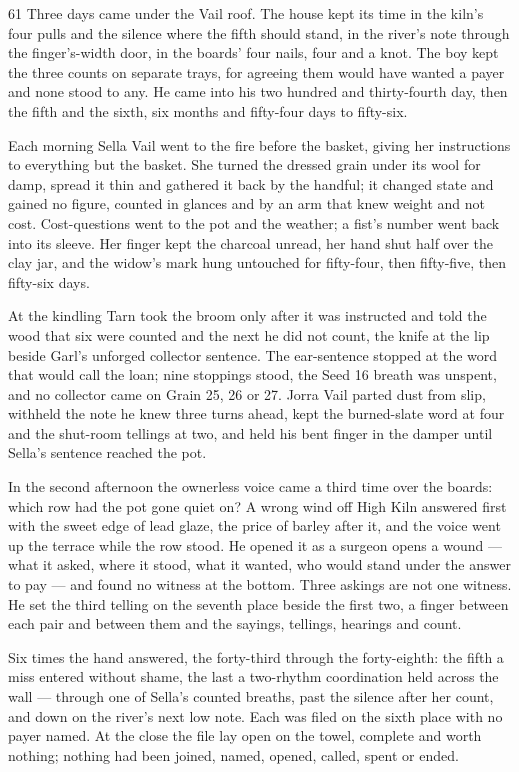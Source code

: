 \begin{CRchronicle}{61}
Three days came under the Vail roof. The house kept its time in the kiln’s four pulls and the silence where the fifth should stand, in the river’s note through the finger’s-width door, in the boards’ four nails, four and a knot. The boy kept the three counts on separate trays, for agreeing them would have wanted a payer and none stood to any. He came into his two hundred and thirty-fourth day, then the fifth and the sixth, six months and fifty-four days to fifty-six.

Each morning Sella Vail went to the fire before the basket, giving her instructions to everything but the basket. She turned the dressed grain under its wool for damp, spread it thin and gathered it back by the handful; it changed state and gained no figure, counted in glances and by an arm that knew weight and not cost. Cost-questions went to the pot and the weather; a fist’s number went back into its sleeve. Her finger kept the charcoal unread, her hand shut half over the clay jar, and the widow’s mark hung untouched for fifty-four, then fifty-five, then fifty-six days.

At the kindling Tarn took the broom only after it was instructed and told the wood that six were counted and the next he did not count, the knife at the lip beside Garl’s unforged collector sentence. The ear-sentence stopped at the word that would call the loan; nine stoppings stood, the Seed 16 breath was unspent, and no collector came on Grain 25, 26 or 27. Jorra Vail parted dust from slip, withheld the note he knew three turns ahead, kept the burned-slate word at four and the shut-room tellings at two, and held his bent finger in the damper until Sella’s sentence reached the pot.

In the second afternoon the ownerless voice came a third time over the boards: which row had the pot gone quiet on? A wrong wind off High Kiln answered first with the sweet edge of lead glaze, the price of barley after it, and the voice went up the terrace while the row stood. He opened it as a surgeon opens a wound --- what it asked, where it stood, what it wanted, who would stand under the answer to pay --- and found no witness at the bottom. Three askings are not one witness. He set the third telling on the seventh place beside the first two, a finger between each pair and between them and the sayings, tellings, hearings and count.

Six times the hand answered, the forty-third through the forty-eighth: the fifth a miss entered without shame, the last a two-rhythm coordination held across the wall --- through one of Sella’s counted breaths, past the silence after her count, and down on the river’s next low note. Each was filed on the sixth place with no payer named. At the close the file lay open on the towel, complete and worth nothing; nothing had been joined, named, opened, called, spent or ended.
\end{CRchronicle}
